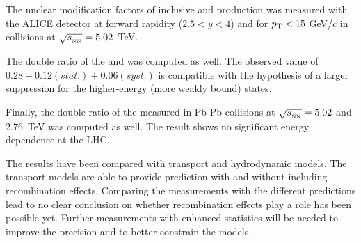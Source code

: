 The nuclear modification factors of inclusive \upsis and \upsiss production was measured with the ALICE detector at forward rapidity ($2.5<y<4$) and for $p_{\rm T}<15$ GeV/$c$ in \pbpb collisions at $\sqrt{s_{_{\rm NN}}}=5.02$~\rm{TeV}.

The double ratio of the \upsis and \upsiss \raa was computed as well. 
The observed value of $ 0.28 \pm 0.12(stat.) \pm 0.06(syst.)$ is compatible with the hypothesis of a larger suppression for the higher-energy (more weakly bound) states.

Finally, the double ratio of the \upsi \raa measured in Pb-Pb collisions at $\sqrt{s_{_{\rm NN}}}=5.02$ and $2.76$~\rm{TeV} was computed as well. 
The result shows no significant energy dependence at the LHC.


The results have been compared with transport and hydrodynamic models.
The transport models are able to provide prediction with and without including recombination effects.
Comparing the measurements with the different predictions lead to no clear conclusion on whether recombination effects play a role has been possible yet.
Further measurements with enhanced statistics will be needed to improve the precision and to better constrain the models.